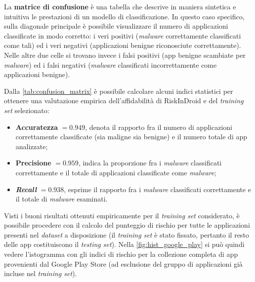 \documentclass[12pt,a4paper,oneside]{article}
\begin{document}
\noindent La \textbf{matrice di confusione} \cite{STATISTICAL_INTRO} è una tabella che descrive in maniera sintetica e intuitiva le prestazioni di un modello di classificazione. In questo caso specifico, sulla diagonale principale è possibile visualizzare il numero di applicazioni classificate in modo corretto: i veri positivi (\textit{malware} correttamente classificati come tali) ed i veri negativi (applicazioni benigne riconosciute correttamente). Nelle altre due celle si trovano invece i falsi positivi (app benigne scambiate per \textit{malware}) ed i falsi negativi (\textit{malware} classificati incorrettamente come applicazioni benigne).
\newline

\noindent Dalla \cref{tab:confusion_matrix} è possibile calcolare alcuni indici statistici per ottenere una valutazione empirica dell'affidabilità di RiskInDroid e del \textit{training set} selezionato:
\begin{itemize}
    \item\textbf{Accuratezza} $= 0.949$, denota il rapporto fra il numero di applicazioni correttamente classificate (sia maligne sia benigne) e il numero totale di app analizzate;
    \item\textbf{Precisione} $= 0.959$, indica la proporzione fra i \textit{malware}  classificati correttamente e il totale di applicazioni classificate come \textit{malware};
    \item\textbf{\textit{Recall}} $= 0.938$, esprime il rapporto fra i \textit{malware}  classificati correttamente e il totale di \textit{malware} esaminati.
\end{itemize}
Visti i buoni risultati ottenuti empiricamente per il \textit{training set} considerato, è possibile procedere con il calcolo del punteggio di rischio per tutte le applicazioni presenti nel \textit{dataset} a disposizione (il \textit{training set} è stato fissato, pertanto il resto delle app costituiscono il \textit{testing set}). Nella \cref{fig:hist_google_play} si può quindi vedere l'istogramma con gli indici di rischio per la collezione completa di app provenienti dal Google Play Store (ad esclusione del gruppo di applicazioni già incluse nel \textit{training set}).
\end{document}
